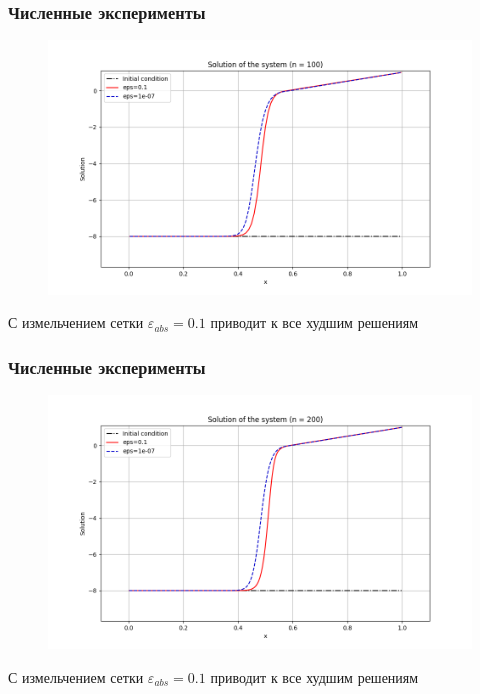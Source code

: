 \documentclass{beamer}
\begin{document}
	\begin{frame}
		\frametitle{Численные эксперименты}
		\begin{figure}[h] \centering
			\includegraphics[width=1\textwidth]{n100}
		\end{figure}
		С измельчением сетки $\varepsilon_{abs} = 0.1$ приводит к все худшим решениям
	\end{frame}
	
	\begin{frame}
	\frametitle{Численные эксперименты}
	\begin{figure}[h] \centering
		\includegraphics[width=1\textwidth]{n200}
	\end{figure}
	С измельчением сетки $\varepsilon_{abs} = 0.1$ приводит к все худшим решениям
	\end{frame}
	
\end{document}
